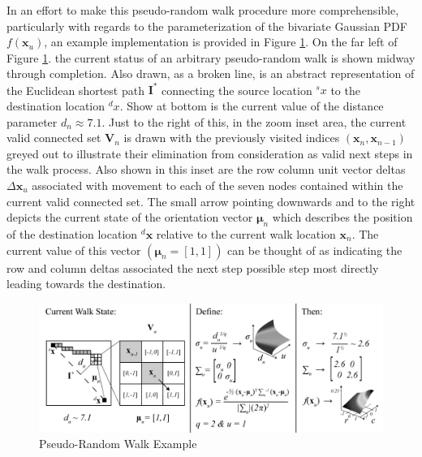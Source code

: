 In an effort to make this pseudo-random walk procedure more comprehensible, particularly with regards to the parameterization of the bivariate Gaussian PDF $f(\textbf{x}_u)$, an example implementation is provided in Figure \ref{fig:pseudo-random-walk-example}. On the far left of Figure \ref{fig:pseudo-random-walk-example}. the current status of an arbitrary pseudo-random walk is shown midway through completion. Also drawn, as a broken line, is an abstract representation of the Euclidean shortest path $\textbf{I}^*$ connecting the source location ${}^{s}x$ to the destination location ${}^{d}x$. Show at bottom is the current value of the distance parameter $d_n \approx 7.1$. Just to the right of this, in the zoom inset area, the current valid connected set $\textbf{V}_n$ is drawn with the previously visited indices $(\textbf{x}_n ,\textbf{x}_{n-1})$ greyed out to illustrate their elimination from consideration as valid next steps in the walk process. Also shown in this inset are the row column unit vector deltas $\Delta\textbf{x}_u$ associated with movement to each of the seven nodes contained within the current valid connected set. The small arrow pointing downwards and to the right depicts the current state of the orientation vector $\boldsymbol\mu_n$ which describes the position of the destination location ${}^{d}\textbf{x}$ relative to the current walk location $\textbf{x}_n$. The current value of this vector $(\boldsymbol\mu_n = [1,1])$ can be thought of as indicating the row and column deltas associated the next step possible step most directly leading towards the destination.
            
            \begin{figure}[!h]
            \centering
            \includegraphics[width=5.5in]{figures/pseudo-random-walk-example.png}
            \caption[Pseudo-Random Walk Example]{Pseudo-Random Walk Example}
            \label{fig:pseudo-random-walk-example}
            \end{figure}
            
